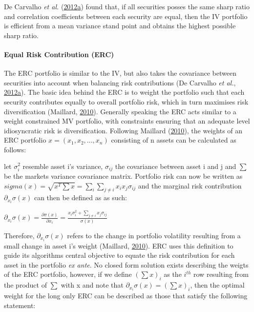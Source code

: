 \documentclass[11pt,preprint, authoryear]{elsarticle}
\numberwithin{equation}{section}
\numberwithin{figure}{section}
\numberwithin{table}{section}
\begin{document}
De Carvalho \emph{et al.}
(\protect\hyperlink{ref-leote}{2012}\protect\hyperlink{ref-leote}{a})
found that, if all securities posses the same sharp ratio and
correlation coefficients between each security are equal, then the IV
portfolio is efficient from a mean variance stand point and obtains the
highest possible sharp ratio.

\hypertarget{equal-risk-contribution-erc}{%
\paragraph{Equal Risk Contribution
(ERC)}\label{equal-risk-contribution-erc}}

The ERC portfolio is similar to the IV, but also takes the covariance
between securities into account when balancing risk contributions (De
Carvalho \emph{et al.},
\protect\hyperlink{ref-leote}{2012}\protect\hyperlink{ref-leote}{a}).
The basic idea behind the ERC is to weight the portfolio such that each
security contributes equally to overall portfolio risk, which in turn
maximises risk diversification (Maillard,
\protect\hyperlink{ref-maillard2010}{2010}). Generally speaking the ERC
acts similar to a weight constrained MV portfolio, with constraints
ensuring that an adequate level idiosyncratic risk is diversification.
Following Maillard (\protect\hyperlink{ref-maillard2010}{2010}), the
weights of an ERC portfolio \(x=(x_1,x_2,...,x_n)\) consisting of n
assets can be calculated as follows:

let \(\sigma_i^2\) resemble asset i's variance, \(\sigma_{ij}\) the
covariance between asset i and j and \(\sum\) be the markets variance
covariance matrix. Portfolio risk can now be written as
\(sigma(x)=\sqrt{x^T\sum x}=\sum_i\sum_{j\neq i}x_ix_j\sigma_{ij}\) and
the marginal risk contribution \(\partial_{x_i}\sigma(x)\) can then be
defined as as such:

\begin{center}
$\partial_{x_i}\sigma(x)=\frac{\partial\sigma(x)}{\partial x_i}=\frac{x_i\sigma_i^2+\sum_{j\neq i}x_j\sigma_{ij}}{\sigma(x)}$ 
\end{center}

Therefore, \(\partial_{x_i}\sigma(x)\) refers to the change in portfolio
volatility resulting from a small change in asset i's weight (Maillard,
\protect\hyperlink{ref-maillard2010}{2010}). ERC uses this definition to
guide its algorithms central objective to equate the risk contribution
for each asset in the portfolio \emph{ex ante}. No closed form solution
exists describing the weigts of the ERC portfolio, however, if we define
\((\sum x)_i\) as the \(i^{th}\) row resulting from the product of
\(\sum\) with x and note that \(\partial_{x_i}\sigma(x)=(\sum x)_i\),
then the optimal weight for the long only ERC can be described as those
that satisfy the following statement:
\end{document}
